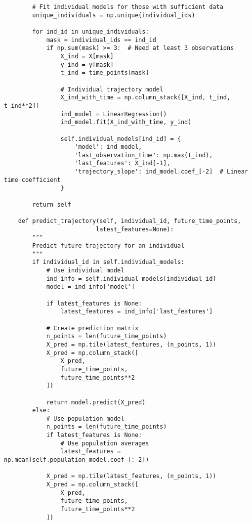 \documentclass[12pt]{article}
\begin{document}
\begin{lstlisting}
        # Fit individual models for those with sufficient data
        unique_individuals = np.unique(individual_ids)
        
        for ind_id in unique_individuals:
            mask = individual_ids == ind_id
            if np.sum(mask) >= 3:  # Need at least 3 observations
                X_ind = X[mask]
                y_ind = y[mask]
                t_ind = time_points[mask]
                
                # Individual trajectory model
                X_ind_with_time = np.column_stack([X_ind, t_ind, t_ind**2])
                ind_model = LinearRegression()
                ind_model.fit(X_ind_with_time, y_ind)
                
                self.individual_models[ind_id] = {
                    'model': ind_model,
                    'last_observation_time': np.max(t_ind),
                    'last_features': X_ind[-1],
                    'trajectory_slope': ind_model.coef_[-2]  # Linear time coefficient
                }
        
        return self
    
    def predict_trajectory(self, individual_id, future_time_points, 
                          latest_features=None):
        """
        Predict future trajectory for an individual
        """
        if individual_id in self.individual_models:
            # Use individual model
            ind_info = self.individual_models[individual_id]
            model = ind_info['model']
            
            if latest_features is None:
                latest_features = ind_info['last_features']
            
            # Create prediction matrix
            n_points = len(future_time_points)
            X_pred = np.tile(latest_features, (n_points, 1))
            X_pred = np.column_stack([
                X_pred, 
                future_time_points, 
                future_time_points**2
            ])
            
            return model.predict(X_pred)
        else:
            # Use population model
            n_points = len(future_time_points)
            if latest_features is None:
                # Use population averages
                latest_features = np.mean(self.population_model.coef_[:-2])
            
            X_pred = np.tile(latest_features, (n_points, 1))
            X_pred = np.column_stack([
                X_pred,
                future_time_points,
                future_time_points**2
            ])
            

\end{lstlisting}
\end{document}
